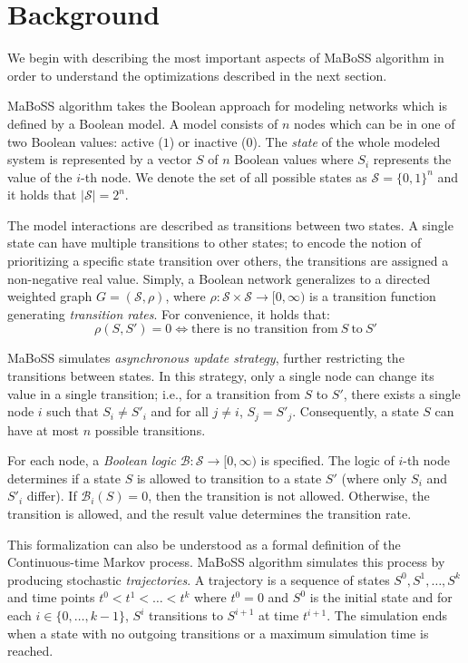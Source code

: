 \documentclass[times, twoside]{zHenriquesLab-StyleBioRxiv}
\begin{document}
\section*{Background}

We begin with describing the most important aspects of MaBoSS algorithm in order to understand the optimizations described in the next section.  

MaBoSS algorithm takes the Boolean approach for modeling networks which is defined by a Boolean model. A model consists of $n$ nodes which can be in one of two Boolean values: active ($1$) or inactive ($0$). The \emph{state} of the whole modeled system is represented by a vector $S$ of $n$ Boolean values where $S_i$ represents the value of the $i$-th node. We denote the set of all possible states as $\mathcal{S} = \{0, 1\}^n$ and it holds that $|\mathcal{S}| = 2^n$. 

The model interactions are described as transitions between two states. A single state can have multiple transitions to other states; to encode the notion of prioritizing a specific state transition over others, the transitions are assigned a non-negative real value. Simply, a Boolean network generalizes to a directed weighted graph $G = (\mathcal{S}, \rho)$, where $\rho: \mathcal{S} \times \mathcal{S} \rightarrow [0, \infty)$ is a transition function generating \emph{transition rates}. For convenience, it holds that:
\begin{equation}
    \rho(S, S') = 0 \iff \text{there is no transition from}\ S\ \text{to}\ S'
\end{equation}

MaBoSS simulates \emph{asynchronous update strategy}, further restricting the transitions between states. In this strategy, only a single node can change its value in a single transition; i.e., for a transition from $S$ to $S'$, there exists a single node $i$ such that $S_i \neq S'_i$ and for all $j \neq i$, $S_j = S'_j$. Consequently, a state $S$ can have at most $n$ possible transitions.

For each node, a \emph{Boolean logic} $\mathcal{B}: \mathcal{S} \rightarrow [0, \infty)$ is specified. The logic of $i$-th node determines if a state $S$ is allowed to transition to a state $S'$ (where only $S_i$ and $S'_i$ differ). If $\mathcal{B}_i(S) = 0$, then the transition is not allowed. Otherwise, the transition is allowed, and the result value determines the transition rate.

This formalization can also be understood as a formal definition of the Continuous-time Markov process. MaBoSS algorithm simulates this process by producing stochastic \emph{trajectories}. A trajectory is a sequence of states $S^0, S^1, \dots, S^k$ and time points $t^0 < t^1 < \dots < t^k$ where $t^0 = 0$ and $S^0$ is the initial state and for each $i \in \{0, \dots, k-1\}$, $S^i$ transitions to $S^{i+1}$ at time $t^{i+1}$. The simulation ends when a state with no outgoing transitions or a maximum simulation time is reached.
\end{document}
